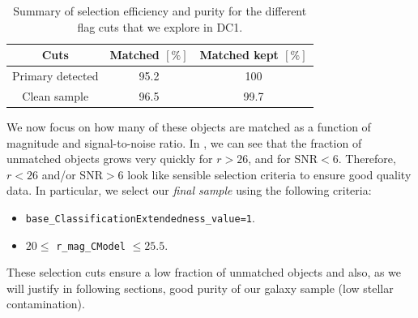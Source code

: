 \documentclass[\docopts]{\docclass}
\begin{document}
\begin{table}
\centering
\begin{tabular}{|c|c|c|}
\hline
Cuts & Matched $[\%]$ & Matched kept $[\%]$\\
\hline
Primary detected & 95.2 & 100\\
Clean sample & 96.5 & 99.7\\
\hline
\end{tabular}
\caption{Summary of selection efficiency and purity for the different flag cuts that we explore in DC1.}%
\label{tab:summary_flag_selection}
\end{table}

We now focus on how many of these objects are matched as a function of magnitude and signal-to-noise ratio. In , we can see that the fraction of unmatched objects grows very quickly for $r > 26$, and for SNR$<6$. Therefore, $r < 26$ and/or SNR$>6$ look like sensible selection criteria to ensure good quality data. In particular, we select our \textit{final sample} using the following criteria:

\begin{itemize}
\item \texttt{base\_ClassificationExtendedness\_value=1}.
\item $20 \leq$ \texttt{r\_mag\_CModel} $\leq 25.5$. 
\end{itemize}

These selection cuts ensure a low fraction of unmatched objects and also, as we will justify in following sections, good purity of our galaxy sample (low stellar contamination).
\end{document}
